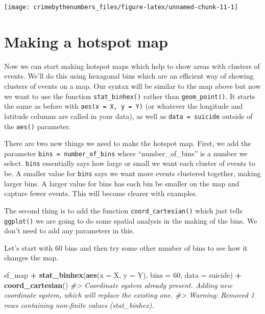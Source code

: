 \documentclass[
  12pt,
]{book}
\newenvironment{Shaded}{\begin{snugshade}}{\end{snugshade}}
\newcommand{\CommentTok}[1]{\textcolor[rgb]{0.37,0.37,0.37}{\textit{#1}}}
\newcommand{\DataTypeTok}[1]{\textcolor[rgb]{0.27,0.27,0.27}{#1}}
\newcommand{\DecValTok}[1]{\textcolor[rgb]{0.06,0.06,0.06}{#1}}
\newcommand{\KeywordTok}[1]{\textcolor[rgb]{0.27,0.27,0.27}{\textbf{#1}}}
\newcommand{\NormalTok}[1]{#1}
\newcommand{\OperatorTok}[1]{\textcolor[rgb]{0.43,0.43,0.43}{\textbf{#1}}}
\newcommand{\StringTok}[1]{\textcolor[rgb]{0.5,0.5,0.5}{#1}}
\begin{document}
\begin{Shaded}
\end{Shaded}

\begin{center}\texttt{[image: crimebythenumbers\_files/figure-latex/unnamed-chunk-11-1]} \end{center}

\hypertarget{making-a-hotspot-map}{%
\section{Making a hotspot map}\label{making-a-hotspot-map}}

Now we can start making hotspot maps which help to show areas with clusters of events. We'll do this using hexagonal bins which are an efficient way of showing clusters of events on a map. Our syntax will be similar to the map above but now we want to use the function \texttt{stat\_binhex()} rather than \texttt{geom\_point()}. It starts the same as before with \texttt{aes(x\ =\ X,\ y\ =\ Y)} (or whatever the longitude and latitude columns are called in your data), as well as \texttt{data\ =\ suicide} outside of the \texttt{aes()} parameter.

There are two new things we need to make the hotspot map. First, we add the parameter \texttt{bins\ =\ number\_of\_bins} where ``number\_of\_bins'' is a number we select. \texttt{bins} essentially says how large or small we want each cluster of events to be. A smaller value for \texttt{bins} says we want more events clustered together, making larger bins. A larger value for bins has each bin be smaller on the map and capture fewer events. This will become clearer with examples.

The second thing is to add the function \texttt{coord\_cartesian()} which just tells \texttt{ggplot()} we are going to do some spatial analysis in the making of the bins. We don't need to add any parameters in this.

Let's start with 60 bins and then try some other number of bins to see how it changes the map.

\begin{Shaded}
\begin{Highlighting}[]
\NormalTok{sf\_map }\OperatorTok{+}
\StringTok{  }\KeywordTok{stat\_binhex}\NormalTok{(}\KeywordTok{aes}\NormalTok{(}\DataTypeTok{x =}\NormalTok{ X, }\DataTypeTok{y =}\NormalTok{ Y),}
              \DataTypeTok{bins =} \DecValTok{60}\NormalTok{,}
              \DataTypeTok{data =}\NormalTok{ suicide) }\OperatorTok{+}
\StringTok{  }\KeywordTok{coord\_cartesian}\NormalTok{() }
\CommentTok{\#\textgreater{} Coordinate system already present. Adding new coordinate system, which will replace the existing one.}
\CommentTok{\#\textgreater{} Warning: Removed 1 rows containing non{-}finite values (stat\_binhex).}
\end{Highlighting}
\end{Shaded}
\end{document}
